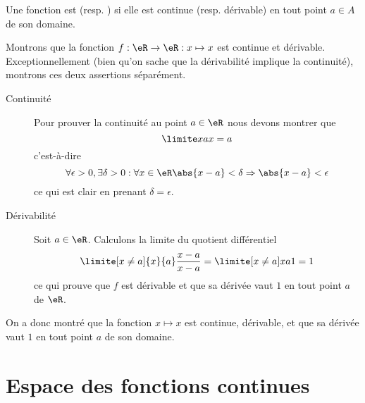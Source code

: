 \begin{definition}
  Une fonction est  (resp. ) si elle est continue (resp. dérivable) en tout point $a \in A$ de son domaine.
\end{definition}

\begin{example}
      Montrons que la fonction $f : \eR \to \eR : x\mapsto x$ est continue et dérivable. Exceptionnellement (bien qu'on sache que la dérivabilité implique la continuité), montrons ces deux assertions séparément.
      \begin{description}
      \item[Continuité] Pour prouver la continuité au point $a \in \eR$ nous devons montrer que
     \begin{equation}
       \limite x a x = a
     \end{equation}
     c'est-à-dire
     \begin{equation}
       \forall \epsilon > 0, \exists \delta > 0 :  \forall x \in \eR \abs{x-a} <
       \delta \Rightarrow \abs{x-a} < \epsilon
     \end{equation}
     ce qui est clair en prenant $\delta = \epsilon$.

      \item[Dérivabilité] Soit $a \in \eR$. Calculons la limite du quotient différentiel
        \begin{equation}
          \limite[x\neq a]{x}{a} \frac{x-a}{x-a} = \limite[x\neq a]x a 1 = 1
        \end{equation}
        ce qui prouve que $f$ est dérivable et que sa dérivée vaut $1$ en
        tout point $a$ de $\eR$.
      \end{description}

     On a donc montré que la fonction $x \mapsto x$ est continue, dérivable, et que sa dérivée vaut $1$ en tout point $a$ de son domaine.

\end{example}

\section{Espace des fonctions continues}

